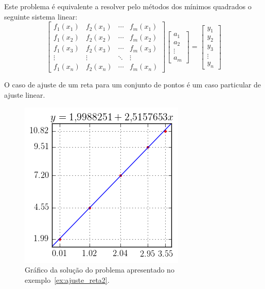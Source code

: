 \begin{obs} Este problema é equivalente a resolver pelo métodos dos mínimos quadrados o seguinte sistema linear:
  \begin{equation*}
    \begin{bmatrix}
      f_1(x_1)&f_2(x_1) & \cdots & f_m(x_1)\\
      f_1(x_2)&f_2(x_2) & \cdots & f_m(x_2)\\
      f_1(x_3)&f_2(x_3) & \cdots & f_m(x_3)\\
      \vdots & \vdots & \ddots & \vdots\\
      f_1(x_n)&f_2(x_n) & \cdots & f_m(x_n)
    \end{bmatrix}
    \begin{bmatrix}
      a_1\\
      a_2\\
      \vdots\\
      a_m
    \end{bmatrix}
    =\begin{bmatrix}
      y_1\\
      y_2\\
      y_3\\
      \vdots\\
      y_n
    \end{bmatrix}
  \end{equation*}
\end{obs}

O caso de ajuste de um reta para um conjunto de pontos é um caso particular de ajuste linear.

\begin{figure}
  \centering
  \includegraphics{cap_ajuste/pics/ex_ajuste_reta2/ex_ajuste_reta2}
  \caption{Gráfico da solução do problema apresentado no exemplo~\ref{ex:ajuste_reta2}.}
  \label{fig:ex_ajuste_reta2}
\end{figure}

